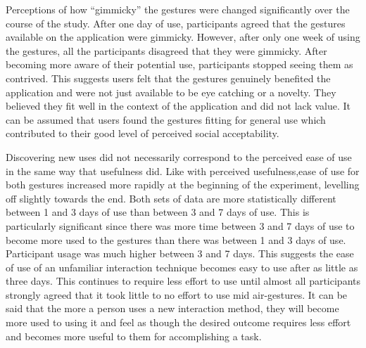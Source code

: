 \documentclass{l4proj}
\begin{document}
Perceptions of how ``gimmicky'' the gestures were changed significantly over the course of the study. After one day of use, participants agreed that the gestures available on the application were gimmicky. However, after only one week of using the gestures, all the participants disagreed that they were gimmicky. After becoming more aware of their potential use, participants stopped seeing them as contrived. This suggests users felt that the gestures genuinely benefited the application and were not just available to be eye catching or a novelty. They believed they fit well in the context of the application and did not lack value. It can be assumed that users found the gestures fitting for general use which contributed to their good level of perceived social acceptability.

Discovering new uses did not necessarily correspond to the perceived ease of use in the same way that usefulness did. Like with perceived usefulness,ease of use for both gestures increased more rapidly at the beginning of the experiment, levelling off slightly towards the end. Both sets of data are more statistically different between 1 and 3 days of use than between 3 and 7 days of use. This is particularly significant since there was more time between 3 and 7 days of use to become more used to the gestures than there was between 1 and 3 days of use. Participant usage was much higher between 3 and 7 days. This suggests the ease of use of an unfamiliar interaction technique becomes easy to use after as little as three days. This continues to require less effort to use until almost all participants strongly agreed that it took little to no effort to use mid air-gestures. It can be said that the more a person uses a new interaction method, they will become more used to using it and feel as though the desired outcome requires less effort and becomes more useful to them for accomplishing a task.
\end{document}
